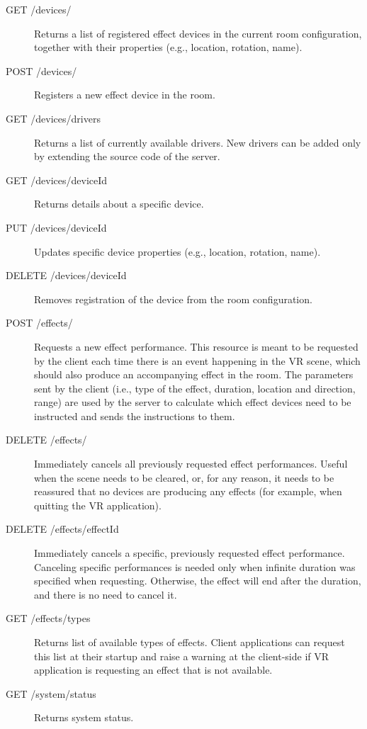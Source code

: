 \begin{description}

\item[GET /devices/]Returns a list of registered effect devices in the current room configuration,
together with their properties (e.g., location, rotation, name).

\item[POST /devices/]Registers a new effect device in the room.

\item[GET /devices/drivers]Returns a list of currently available drivers. New drivers can be added only
by extending the source code of the server.

\item[GET /devices/{deviceId}]Returns details about a specific device.

\item[PUT /devices/{deviceId}]Updates specific device properties (e.g., location, rotation, name).

\item[DELETE /devices/{deviceId}]Removes registration of the device from the room configuration.

\item[POST /effects/]Requests a new effect performance. This resource is meant to be requested by the
client each time there is an event happening in the VR scene, which should also
produce an accompanying effect in the room. The parameters sent by the client
(i.e., type of the effect, duration, location and direction, range) are used
by the server to calculate which effect devices need to be instructed and sends
the instructions to them.

\item[DELETE /effects/]Immediately cancels all previously requested effect performances. Useful when
the scene needs to be cleared, or, for any reason, it needs to be reassured that
no devices are producing any effects (for example, when quitting the VR
application).

\item[DELETE /effects/{effectId}]Immediately cancels a specific, previously requested effect performance.
Canceling specific performances is needed only when infinite duration
was specified when requesting. Otherwise, the effect will end after the
duration, and there is no need to cancel it.

\item[GET /effects/types]Returns list of available types of effects. Client applications can request
this list at their startup and raise a warning at the client-side if VR
application is requesting an effect that is not available.

\item[GET /system/status]Returns system status.

\end{description}


